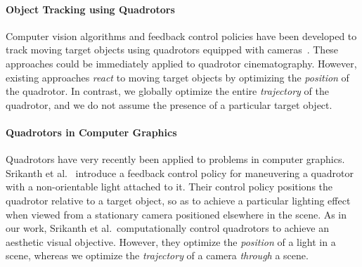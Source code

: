 \paragraph{Object Tracking using Quadrotors}
Computer vision algorithms and feedback control policies have been developed to track moving target objects using quadrotors equipped with cameras~\cite{teuliere:2011}.
These approaches could be immediately applied to quadrotor cinematography.
However, existing approaches \emph{react} to moving target objects by optimizing the \emph{position} of the quadrotor.
In contrast, we globally optimize the entire \emph{trajectory} of the quadrotor, and we do not assume the presence of a particular target object.

\paragraph{Quadrotors in Computer Graphics}
Quadrotors have very recently been applied to problems in computer graphics.
Srikanth et al.~ introduce a feedback control policy for maneuvering a quadrotor with a non-orientable light attached to it.
Their control policy positions the quadrotor relative to a target object, so as to achieve a particular lighting effect when viewed from a stationary camera positioned elsewhere in the scene.
As in our work, Srikanth et al.~computationally control quadrotors to achieve an aesthetic visual objective.
However, they optimize the \emph{position} of a light in a scene, whereas we optimize the \emph{trajectory} of a camera \emph{through} a scene.
